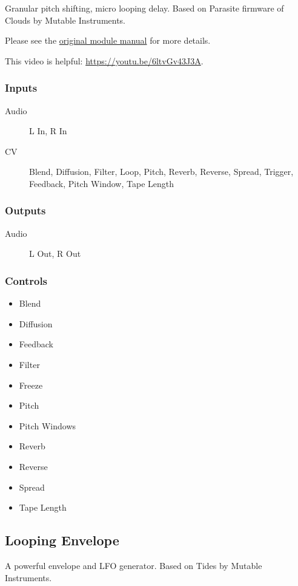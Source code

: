Granular pitch shifting, micro looping delay. Based on Parasite firmware of Clouds by Mutable Instruments.



Please see the \href{https://mqtthiqs.github.io/parasites/clouds.html}{original module manual} for more details.

This video is helpful: \url{https://youtu.be/6ltvGv43J3A}.

\subsubsection{Inputs}
\begin{description}
\item [Audio] L In, R In
\item [CV] Blend, Diffusion, Filter, Loop, Pitch, Reverb, Reverse, Spread, Trigger, Feedback, Pitch Window, Tape Length
\end{description}

\subsubsection{Outputs}
\begin{description}
\item [Audio] L Out, R Out
\end{description}

\subsubsection{Controls}
\begin{itemize}
\item Blend
\item Diffusion
\item Feedback
\item Filter
\item Freeze
\item Pitch
\item Pitch Windows
\item Reverb
\item Reverse
\item Spread
\item Tape Length
\end{itemize}

\subsection{Looping Envelope}

A powerful envelope and LFO generator.
Based on Tides by Mutable Instruments. 

